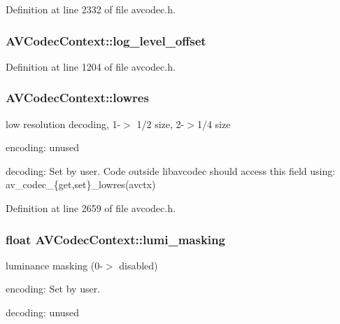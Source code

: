 Definition at line 2332 of file avcodec.\+h.

\subsubsection[{\texorpdfstring{log\+\_\+level\+\_\+offset}{log_level_offset}}]{ A\+V\+Codec\+Context\+::log\+\_\+level\+\_\+offset}\hypertarget{struct_a_v_codec_context_a7f9e4467c3394228bc3c9f308a42303c}{}\label{struct_a_v_codec_context_a7f9e4467c3394228bc3c9f308a42303c}


Definition at line 1204 of file avcodec.\+h.

\subsubsection[{\texorpdfstring{lowres}{lowres}}]{ A\+V\+Codec\+Context\+::lowres}\hypertarget{struct_a_v_codec_context_af260210a39ad4781d8d47ddac1541d04}{}\label{struct_a_v_codec_context_af260210a39ad4781d8d47ddac1541d04}
low resolution decoding, 1-\/$>$ 1/2 size, 2-\/$>$1/4 size
\begin{DoxyItemize}
\item encoding\+: unused
\item decoding\+: Set by user. Code outside libavcodec should access this field using\+: av\+\_\+codec\+\_\+\{get,set\}\+\_\+lowres(avctx) 
\end{DoxyItemize}

Definition at line 2659 of file avcodec.\+h.

\subsubsection[{\texorpdfstring{lumi\+\_\+masking}{lumi_masking}}]{\setlength{\rightskip}{0pt plus 5cm}float A\+V\+Codec\+Context\+::lumi\+\_\+masking}\hypertarget{struct_a_v_codec_context_ae14fedf2fb0f6bda26a1badae5f8aeb4}{}\label{struct_a_v_codec_context_ae14fedf2fb0f6bda26a1badae5f8aeb4}
luminance masking (0-\/$>$ disabled)
\begin{DoxyItemize}
\item encoding\+: Set by user.
\item decoding\+: unused 
\end{DoxyItemize}

